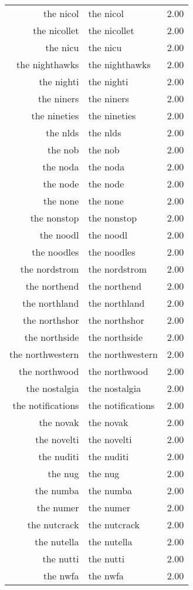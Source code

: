 \begin{table}[ht]
\begin{tabular}{rlr}
  the nicol & the nicol & 2.00 \\ 
  the nicollet & the nicollet & 2.00 \\ 
  the nicu & the nicu & 2.00 \\ 
  the nighthawks & the nighthawks & 2.00 \\ 
  the nighti & the nighti & 2.00 \\ 
  the niners & the niners & 2.00 \\ 
  the nineties & the nineties & 2.00 \\ 
  the nlds & the nlds & 2.00 \\ 
  the nob & the nob & 2.00 \\ 
  the noda & the noda & 2.00 \\ 
  the node & the node & 2.00 \\ 
  the none & the none & 2.00 \\ 
  the nonstop & the nonstop & 2.00 \\ 
  the noodl & the noodl & 2.00 \\ 
  the noodles & the noodles & 2.00 \\ 
  the nordstrom & the nordstrom & 2.00 \\ 
  the northend & the northend & 2.00 \\ 
  the northland & the northland & 2.00 \\ 
  the northshor & the northshor & 2.00 \\ 
  the northside & the northside & 2.00 \\ 
  the northwestern & the northwestern & 2.00 \\ 
  the northwood & the northwood & 2.00 \\ 
  the nostalgia & the nostalgia & 2.00 \\ 
  the notifications & the notifications & 2.00 \\ 
  the novak & the novak & 2.00 \\ 
  the novelti & the novelti & 2.00 \\ 
  the nuditi & the nuditi & 2.00 \\ 
  the nug & the nug & 2.00 \\ 
  the numba & the numba & 2.00 \\ 
  the numer & the numer & 2.00 \\ 
  the nutcrack & the nutcrack & 2.00 \\ 
  the nutella & the nutella & 2.00 \\ 
  the nutti & the nutti & 2.00 \\ 
  the nwfa & the nwfa & 2.00 \\ 

\end{tabular}
\end{table}
